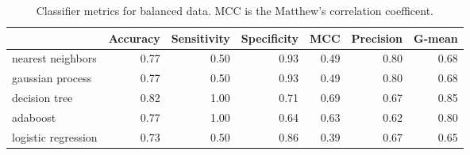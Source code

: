 \begin{table}[H]
\centering
\caption{Classifier metrics for balanced data. MCC is the Matthew’s correlation coefficent.}
\label{tbl:mordred_features}
\begin{tabular}{lrrrrrr}
\toprule
{} &  Accuracy &  Sensitivity &  Specificity &  MCC &  Precision &  G-mean \\
\midrule
nearest neighbors   &      0.77 &         0.50 &         0.93 & 0.49 &       0.80 &    0.68 \\
gaussian process    &      0.77 &         0.50 &         0.93 & 0.49 &       0.80 &    0.68 \\
decision tree       &      0.82 &         1.00 &         0.71 & 0.69 &       0.67 &    0.85 \\
adaboost            &      0.77 &         1.00 &         0.64 & 0.63 &       0.62 &    0.80 \\
logistic regression &      0.73 &         0.50 &         0.86 & 0.39 &       0.67 &    0.65 \\
\bottomrule
\end{tabular}
\end{table}
